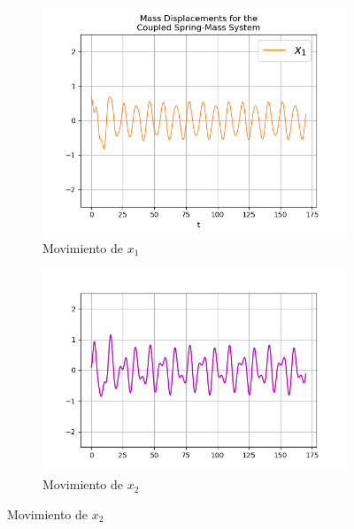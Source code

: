 \documentclass{article}
\begin{document}
\begin{figure}[ht!]
	\begin{subfigure}[b]{0.5\linewidth}
    \raggedleft
	\includegraphics[width=\linewidth]{ejercicio41-x1.png}
    \caption{Movimiento de $x_1$}
	\end{subfigure}
	\begin{subfigure}[b]{0.5\linewidth}
    \raggedright
	\includegraphics[width=\linewidth]{ejercicio41-x2.png}
	\caption{Movimiento de $x_2$}
    \end{subfigure}
\end{figure}
\end{document}
